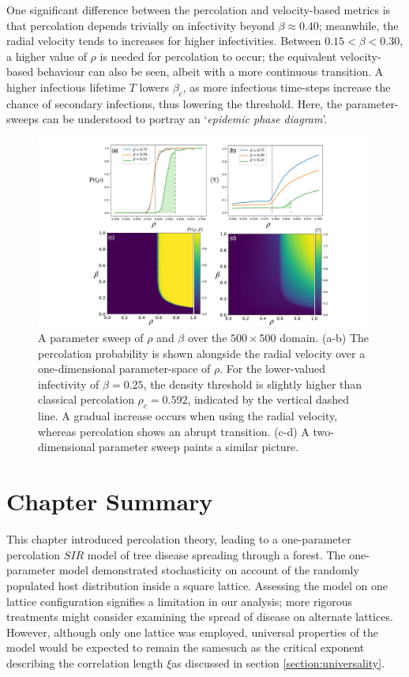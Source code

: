 One significant difference between the percolation and velocity-based metrics is that percolation depends trivially on infectivity beyond $\beta \approx 0.40$; meanwhile, the radial velocity tends to increases for higher infectivities.
Between $0.15 <\beta<0.30$, a higher value of $\rho$ is needed for percolation to occur;
the equivalent velocity-based behaviour can also be seen, albeit with a more continuous transition.
A higher infectious lifetime $T$ lowers $\beta_c$, as more infectious time-steps increase the chance of secondary infections, thus lowering the threshold.
Here, the parameter-sweeps can be understood to portray an `\textit{epidemic phase diagram}'.

\begin{figure}
    \centering
    \includegraphics[scale=0.325]{chapter3/figures/figure4-perc-vel-phase-trans.pdf}
    \caption{
    A parameter sweep of $\rho$ and $\beta$ over the $500\times500$ domain. (a-b) The percolation probability is shown alongside the radial velocity over a one-dimensional parameter-space of $\rho$. For the lower-valued infectivity of $\beta=0.25$, the density threshold is slightly higher than classical percolation  $\rho_c=0.592$, indicated by the vertical dashed line. A gradual increase occurs when using the radial velocity, whereas percolation shows an abrupt transition. (c-d) A two-dimensional parameter sweep paints a similar picture.
    }
    \label{fig:slm_pspace}
\end{figure}


\newpage

\section{Chapter Summary}

This chapter introduced percolation theory, leading to a one-parameter percolation $SIR$ model of tree disease spreading through a forest.
The one-parameter model demonstrated stochasticity on account of the randomly populated host distribution inside a square lattice. 
Assessing the model on one lattice configuration signifies a limitation in our analysis; 
more rigorous treatments might consider examining the spread of disease on alternate lattices.
However, although only one lattice was employed, universal properties of the model would be expected to remain the same\textemdash such as the critical exponent describing the correlation length $\xi$\textemdash as discussed in section \ref{section:universality}.

